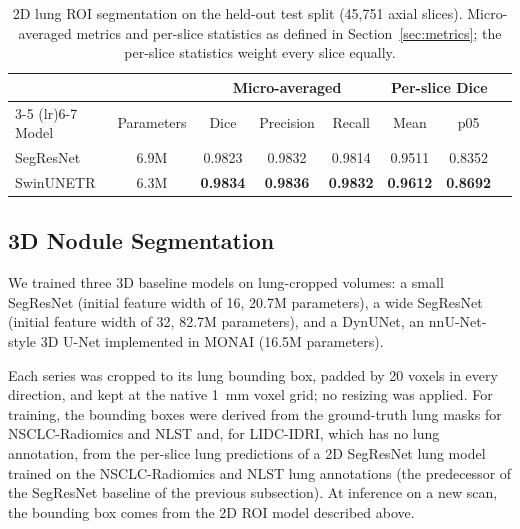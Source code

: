 \begin{table}
\caption{2D lung ROI segmentation on the held-out test split (45,751 axial slices). Micro-averaged metrics and per-slice statistics as defined in Section~\ref{sec:metrics}; the per-slice statistics weight every slice equally.}
\label{tab:roi2d}
\centering
\small
\setlength{\tabcolsep}{4pt}
\begin{tabular}{lccccccc}
\toprule
& & \multicolumn{3}{c}{Micro-averaged} & \multicolumn{2}{c}{Per-slice Dice} \\
\cmidrule(lr){3-5} \cmidrule(lr){6-7}
Model & Parameters & Dice & Precision & Recall & Mean & p05 \\
\midrule
SegResNet & 6.9M & 0.9823 & 0.9832 & 0.9814 & 0.9511 & 0.8352 \\
SwinUNETR & 6.3M & \textbf{0.9834} & \textbf{0.9836} & \textbf{0.9832} & \textbf{0.9612} & \textbf{0.8692} \\
\bottomrule
\end{tabular}
\end{table}

\subsection{3D Nodule Segmentation}
We trained three 3D baseline models on lung-cropped volumes: a small SegResNet (initial feature width of 16, 20.7M parameters), a wide SegResNet (initial feature width of 32, 82.7M parameters), and a DynUNet, an nnU-Net-style 3D U-Net implemented in MONAI \cite{MONAIDynUNet} (16.5M parameters).

Each series was cropped to its lung bounding box, padded by 20 voxels in every direction, and kept at the native 1~mm voxel grid; no resizing was applied. For training, the bounding boxes were derived from the ground-truth lung masks for NSCLC-Radiomics and NLST and, for LIDC-IDRI, which has no lung annotation, from the per-slice lung predictions of a 2D SegResNet lung model trained on the NSCLC-Radiomics and NLST lung annotations (the predecessor of the SegResNet baseline of the previous subsection).
At inference on a new scan, the bounding box comes from the 2D ROI model described above.

